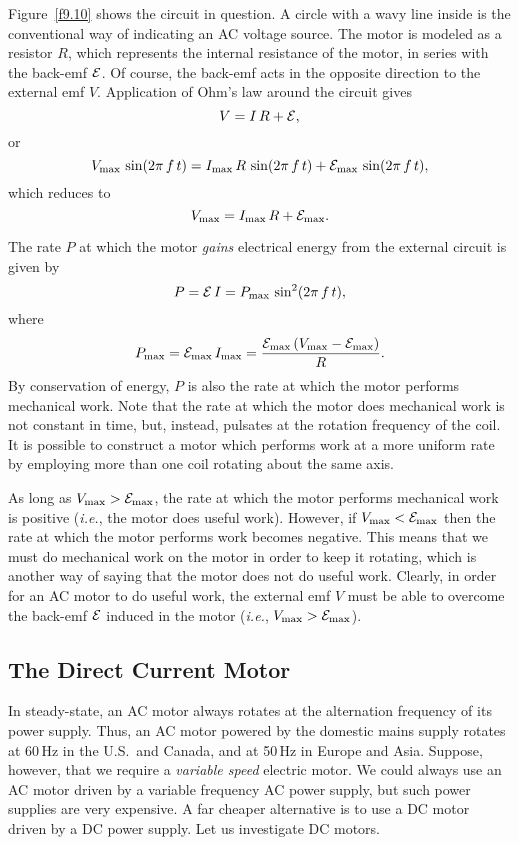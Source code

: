 Figure~\ref{f9.10} shows the circuit in question. A circle with a
wavy line inside is the conventional way of indicating an AC voltage source. 
The motor is modeled as a resistor $R$, which represents the internal
resistance of the motor, in series with the back-emf ${\cal E}$. Of course,
the back-emf acts in the opposite direction to the external emf $V$. 
Application of Ohm's law around the circuit gives
\begin{equation}
V = I\, R + {\cal E},
\end{equation}
or
\begin{equation}
V_{\rm max}\, \sin (2\pi\, f \,t) = I_{\rm max} \,R\,\sin (2\pi\, f\, t) + {\cal E}_{\rm max}\,
\sin (2\pi\, f\, t),
\end{equation}
which reduces to
\begin{equation}
V_{\rm max} = I_{\rm  max} \,R + {\cal E}_{\rm max}.
\end{equation}

The rate $P$ at which the motor {\em gains}\/ electrical energy from the external
circuit is given by
\begin{equation}\label{e9.37}
P = {\cal E}\,I = P_{\rm max}\, \sin^2(2\pi\, f\, t),
\end{equation}
where
\begin{equation}
P_{\rm max} = {\cal E}_{\rm max}\, I_{\rm max} = \frac{ {\cal E}_{\rm  max}\,
(V_{\rm max} - {\cal E}_{\rm max})}{R}.
\end{equation}
By conservation of energy, $P$ is also the rate at which the motor performs
mechanical work. Note that the rate at which the motor does mechanical
work is not constant in time, but, instead, pulsates at the rotation frequency
of the coil. It is possible to construct a motor which performs work
at a more uniform rate by employing more than one coil rotating about the
same axis. 

As long as $V_{\rm max} > {\cal E}_{\rm max}$, the rate at which the
motor performs mechanical work is positive ({\em i.e.}, the motor 
does useful work). However, if $V_{\rm max} < {\cal E}_{\rm max}$
then the rate at which the motor performs work becomes negative. This means that
we must do mechanical work on the motor in order to keep it rotating, which
is another way of saying that the motor does not do useful work.
Clearly, in order for an AC motor to do useful work, the external emf $V$ must
be able to overcome the back-emf ${\cal E}$ induced in the motor ({\em i.e.},
$V_{\rm max} > {\cal E}_{\rm max}$).


\subsection{The Direct Current Motor}
In steady-state, an AC motor always
rotates at the alternation frequency of its power supply. 
Thus, an AC motor powered by the domestic  mains supply  rotates at 60\,Hz in the
U.S.\, and Canada, and at 50\,Hz in Europe and Asia. Suppose, however, that
we require a {\em variable speed}\/ electric motor. We could always use
an AC motor driven  by a variable frequency AC power supply, but such  power
supplies are very expensive. A far cheaper
alternative is to use a DC motor driven  by a DC power supply. Let us
investigate DC motors.


